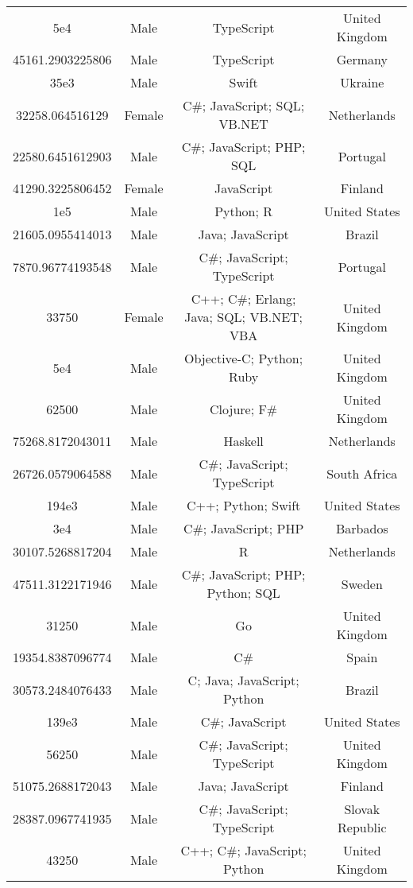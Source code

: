 \begin{center}
\begin{tabular}{ |c|c|c|c| }
5e4  &  Male  &  TypeScript  &  United Kingdom  \\ 
45161.2903225806  &  Male  &  TypeScript  &  Germany  \\ 
35e3  &  Male  &  Swift  &  Ukraine  \\ 
32258.064516129  &  Female  &  C\#; JavaScript; SQL; VB.NET  &  Netherlands  \\ 
22580.6451612903  &  Male  &  C\#; JavaScript; PHP; SQL  &  Portugal  \\ 
41290.3225806452  &  Female  &  JavaScript  &  Finland  \\ 
1e5  &  Male  &  Python; R  &  United States  \\ 
21605.0955414013  &  Male  &  Java; JavaScript  &  Brazil  \\ 
7870.96774193548  &  Male  &  C\#; JavaScript; TypeScript  &  Portugal  \\ 
33750  &  Female  &  C++; C\#; Erlang; Java; SQL; VB.NET; VBA  &  United Kingdom  \\ 
5e4  &  Male  &  Objective-C; Python; Ruby  &  United Kingdom  \\ 
62500  &  Male  &  Clojure; F\#  &  United Kingdom  \\ 
75268.8172043011  &  Male  &  Haskell  &  Netherlands  \\ 
26726.0579064588  &  Male  &  C\#; JavaScript; TypeScript  &  South Africa  \\ 
194e3  &  Male  &  C++; Python; Swift  &  United States  \\ 
3e4  &  Male  &  C\#; JavaScript; PHP  &  Barbados  \\ 
30107.5268817204  &  Male  &  R  &  Netherlands  \\ 
47511.3122171946  &  Male  &  C\#; JavaScript; PHP; Python; SQL  &  Sweden  \\ 
31250  &  Male  &  Go  &  United Kingdom  \\ 
19354.8387096774  &  Male  &  C\#  &  Spain  \\ 
30573.2484076433  &  Male  &  C; Java; JavaScript; Python  &  Brazil  \\ 
139e3  &  Male  &  C\#; JavaScript  &  United States  \\ 
56250  &  Male  &  C\#; JavaScript; TypeScript  &  United Kingdom  \\ 
51075.2688172043  &  Male  &  Java; JavaScript  &  Finland  \\ 
28387.0967741935  &  Male  &  C\#; JavaScript; TypeScript  &  Slovak Republic  \\ 
43250  &  Male  &  C++; C\#; JavaScript; Python  &  United Kingdom  \\ 

\end{tabular}
\end{center}
